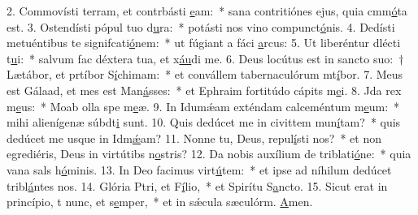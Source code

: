 2. Commovísti terram, et contrbásti \uline{e}am:~* sana contritiónes ejus, quia cmm\uline{ó}ta est.
3. Ostendísti pópul tuo d\uline{u}ra:~* potásti nos vino compunct\uline{ó}nis.
4. Dedísti metuéntibus te signifcati\uline{ó}nem:~* ut fúgiant a fáci \uline{a}rcus:
5. Ut liberéntur dlécti t\uline{u}i:~* salvum fac déxtera tua, et x\uline{áu}di me.
6. Deus locútus est in sancto suo:~† Lætábor, et prtíbor S\uline{í}chimam:~* et convállem tabernaculórum mt\uline{í}bor.
7. Meus est Gálaad, et mes est Man\uline{á}sses:~* et Ephraim fortitúdo cápits m\uline{e}i.
8. Jda rex m\uline{e}us:~* Moab olla spe m\uline{e}æ.
9. In Idumǽam exténdam calceméntum m\uline{e}um:~* mihi alienígenæ súbdt\uline{i} sunt.
10. Quis dedúcet me in civittem mun\uline{í}tam?~* quis dedúcet me usque in Idm\uline{ǽ}am?
11. Nonne tu, Deus,  repul\uline{í}sti nos?~* et non egrediéris, Deus in virtútibs n\uline{o}stris?
12. Da nobis auxílium de triblati\uline{ó}ne:~* quia vana sals h\uline{ó}minis.
13. In Deo facimus virt\uline{ú}tem:~* et ipse ad níhilum dedúcet tribl\uline{á}ntes nos.
14. Glória Ptri, et F\uline{í}lio,~* et Spirítu S\uline{a}ncto.
15. Sicut erat in princípio, t nunc, et s\uline{e}mper,~* et in sǽcula sæculórm. \uline{A}men.
